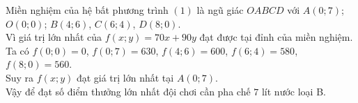 \begin{bt}
{\begin{center}
	\end{center}
	Miền nghiệm của hệ bất phương trình $(1)$ là ngũ giác $OABCD$  với $A(0;7)$; $O(0;0)$; $B(4;6)$, $C(6;4)$, $D(8;0)$. \\
	Vì giá trị lớn nhất của $f(x;y)=70x+90y$ đạt được  tại đỉnh của miền nghiệm.\\
	 Ta có $f(0;0)=0$, $f(0;7)=630$, $f(4;6)=600$, $f(6;4)=580$, $f(8;0)=560$.\\
	Suy ra $f(x;y)$ đạt giá trị lớn nhất tại  $A(0;7)$.\\
	Vậy để đạt số điểm thưởng lớn  nhất đội chơi cần pha chế $7$ lít nước loại B.
	 }
\end{bt}

